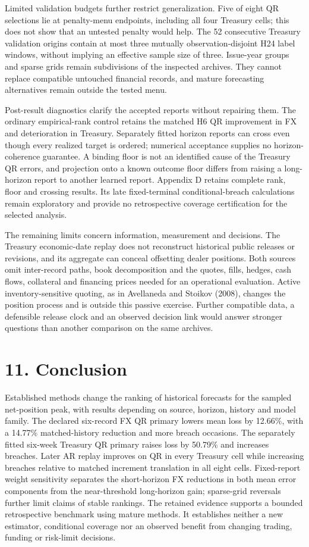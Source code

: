 \documentclass[10pt,a4paper]{article}
\begin{document}
Limited validation budgets further restrict generalization. Five of eight QR selections lie at penalty-menu endpoints, including all four Treasury cells; this does not show that an untested penalty would help. The 52 consecutive Treasury validation origins contain at most three mutually observation-disjoint H24 label windows, without implying an effective sample size of three. Issue-year groups and sparse grids remain subdivisions of the inspected archives. They cannot replace compatible untouched financial records, and mature forecasting alternatives remain outside the tested menu.

Post-result diagnostics clarify the accepted reports without repairing them. The ordinary empirical-rank control retains the matched H6 QR improvement in FX and deterioration in Treasury. Separately fitted horizon reports can cross even though every realized target is ordered; numerical acceptance supplies no horizon-coherence guarantee. A binding floor is not an identified cause of the Treasury QR errors, and projection onto a known outcome floor differs from raising a long-horizon report to another learned report. Appendix D retains complete rank, floor and crossing results. Its late fixed-terminal conditional-breach calculations remain exploratory and provide no retrospective coverage certification for the selected analysis.

The remaining limits concern information, measurement and decisions. The Treasury economic-date replay does not reconstruct historical public releases or revisions, and its aggregate can conceal offsetting dealer positions. Both sources omit inter-record paths, book decomposition and the quotes, fills, hedges, cash flows, collateral and financing prices needed for an operational evaluation. Active inventory-sensitive quoting, as in Avellaneda and Stoikov (2008), changes the position process and is outside this passive exercise. Further compatible data, a defensible release clock and an observed decision link would answer stronger questions than another comparison on the same archives.

\section*{11. Conclusion}
Established methods change the ranking of historical forecasts for the sampled net-position peak, with results depending on source, horizon, history and model family. The declared six-record FX QR primary lowers mean loss by 12.66\%, with a 14.77\% matched-history reduction and more breach occasions. The separately fitted six-week Treasury QR primary raises loss by 50.79\% and increases breaches. Later AR replay improves on QR in every Treasury cell while increasing breaches relative to matched increment translation in all eight cells. Fixed-report weight sensitivity separates the short-horizon FX reductions in both mean error components from the near-threshold long-horizon gain; sparse-grid reversals further limit claims of stable rankings. The retained evidence supports a bounded retrospective benchmark using mature methods. It establishes neither a new estimator, conditional coverage nor an observed benefit from changing trading, funding or risk-limit decisions.
\end{document}
